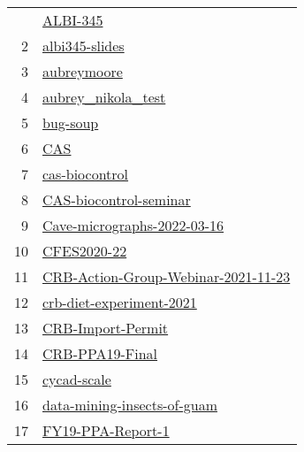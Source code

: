 \begin{longtable}{rl}
\bottomrule
\endlastfoot
 1 &                                                       \href{https://github.com/aubreymoore/ALBI-345}{ALBI-345} \\
 2 &                                           \href{https://github.com/aubreymoore/albi345-slides}{albi345-slides} \\
 3 &                                                 \href{https://github.com/aubreymoore/aubreymoore}{aubreymoore} \\
 4 &                                   \href{https://github.com/aubreymoore/aubrey_nikola_test}{aubrey_nikola_test} \\
 5 &                                                       \href{https://github.com/aubreymoore/bug-soup}{bug-soup} \\
 6 &                                                                 \href{https://github.com/aubreymoore/CAS}{CAS} \\
 7 &                                           \href{https://github.com/aubreymoore/cas-biocontrol}{cas-biocontrol} \\
 8 &                           \href{https://github.com/aubreymoore/CAS-biocontrol-seminar}{CAS-biocontrol-seminar} \\
 9 &                 \href{https://github.com/aubreymoore/Cave-micrographs-2022-03-16}{Cave-micrographs-2022-03-16} \\
10 &                                                 \href{https://github.com/aubreymoore/CFES2020-22}{CFES2020-22} \\
11 & \href{https://github.com/aubreymoore/CRB-Action-Group-Webinar-2021-11-23}{CRB-Action-Group-Webinar-2021-11-23} \\
12 &                       \href{https://github.com/aubreymoore/crb-diet-experiment-2021}{crb-diet-experiment-2021} \\
13 &                                     \href{https://github.com/aubreymoore/CRB-Import-Permit}{CRB-Import-Permit} \\
14 &                                         \href{https://github.com/aubreymoore/CRB-PPA19-Final}{CRB-PPA19-Final} \\
15 &                                                 \href{https://github.com/aubreymoore/cycad-scale}{cycad-scale} \\
16 &                 \href{https://github.com/aubreymoore/data-mining-insects-of-guam}{data-mining-insects-of-guam} \\
17 &                                     \href{https://github.com/aubreymoore/FY19-PPA-Report-1}{FY19-PPA-Report-1} \\

\end{longtable}
